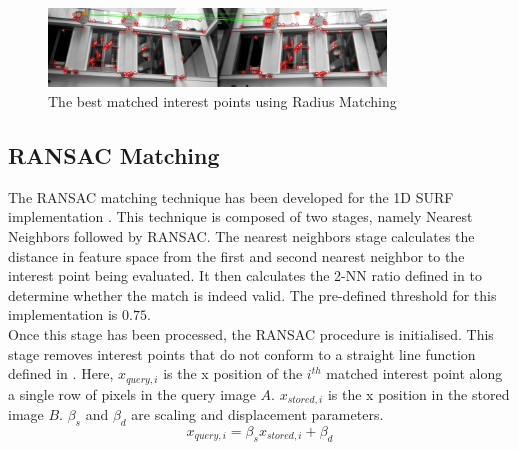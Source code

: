 \documentclass[11pt]{report}
\begin{document}
 \begin{figure}[h!] 
  \centering
    \includegraphics[width=0.8\textwidth]{../Drawings/Matching/feature_matching/dataset1_without_validation_radius_best.jpg}
    \caption{The best matched interest points using Radius Matching}
    \label{fig:radius_best_match}
\end{figure}

\subsection{RANSAC Matching}
\label{sec:ransacMatching}
The RANSAC matching technique has been developed for the 1D SURF implementation \cite{Anderson}. This technique is composed of two stages, namely Nearest Neighbors followed by RANSAC. The nearest neighbors stage calculates the distance in feature space from the first and second nearest neighbor to the interest point being evaluated. It then calculates the 2-NN ratio defined in  to determine whether the match is indeed valid. The pre-defined threshold for this implementation is $0.75$.\\

Once this stage has been processed, the RANSAC procedure is initialised. This stage removes interest points that do not conform to a straight line function defined in  \cite{Anderson}. Here, $x_{query,i}$ is the x position of the $i^{th}$ matched interest point along a single row of pixels in the query image $A$.  $x_{stored,i}$ is the x position in the stored image $B$. $\beta_s$ and $\beta_d$ are scaling and displacement parameters.\\

\begin{equation}
x_{query,i} = \beta_s x_{stored,i} + \beta_d
\label{eqn:straightLine}
\end{equation} 
\end{document}
